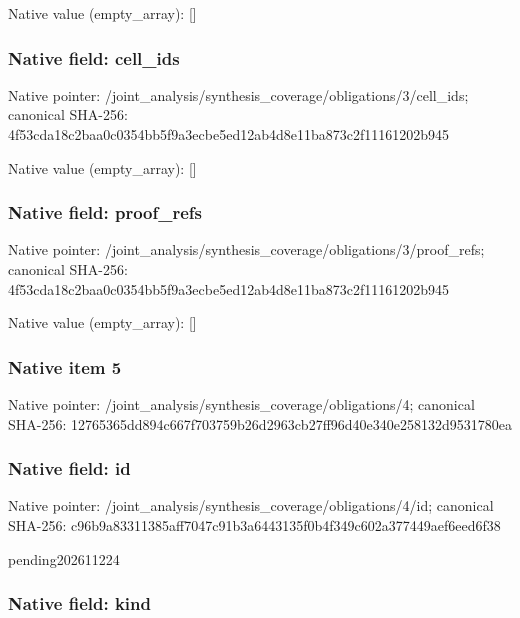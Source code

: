 \documentclass[10pt,a4paper]{article}
\begin{document}
Native value (empty\_array): []



\subsubsection{Native field: cell\_ids}


Native pointer: /joint\_analysis/synthesi\allowbreak{}s\_coverage/obligations/3\allowbreak{}/cell\_ids; canonical SHA-256: 4f53cda18c2baa0c0354bb5f\allowbreak{}9a3ecbe5ed12ab4d8e11ba87\allowbreak{}3c2f11161202b945



Native value (empty\_array): []



\subsubsection{Native field: proof\_refs}


Native pointer: /joint\_analysis/synthesi\allowbreak{}s\_coverage/obligations/3\allowbreak{}/proof\_refs; canonical SHA-256: 4f53cda18c2baa0c0354bb5f\allowbreak{}9a3ecbe5ed12ab4d8e11ba87\allowbreak{}3c2f11161202b945



Native value (empty\_array): []



\subsubsection{Native item 5}


Native pointer: /joint\_analysis/synthesi\allowbreak{}s\_coverage/obligations/4; canonical SHA-256: 12765365dd894c667f703759\allowbreak{}b26d2963cb27ff96d40e340e\allowbreak{}258132d9531780ea



\subsubsection{Native field: id}


Native pointer: /joint\_analysis/synthesi\allowbreak{}s\_coverage/obligations/4\allowbreak{}/id; canonical SHA-256: c96b9a83311385aff7047c91\allowbreak{}b3a6443135f0b4f349c602a3\allowbreak{}77449aef6eed6f38


pending202611224


\subsubsection{Native field: kind}
\end{document}
